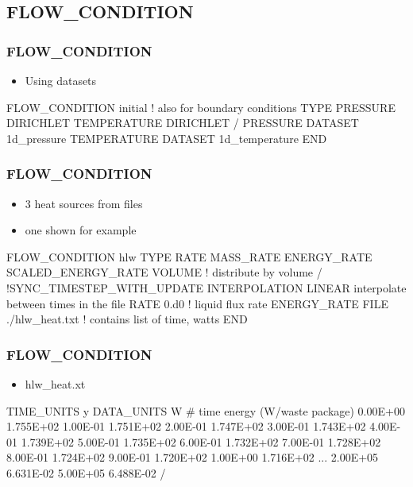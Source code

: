 \documentclass{beamer}
\newcommand\bluecomment[1]{{{\color{blue} #1}}}
\begin{document}
\subsection{FLOW\_CONDITION}

\begin{frame}[fragile]\frametitle{FLOW\_CONDITION}
\begin{itemize}
  \item{Using datasets}
\end{itemize}

\begin{semiverbatim}
FLOW_CONDITION initial \bluecomment{! also for boundary conditions}
  TYPE
    PRESSURE DIRICHLET
    TEMPERATURE DIRICHLET
  /
  PRESSURE DATASET 1d_pressure
  TEMPERATURE DATASET 1d_temperature
END

\end{semiverbatim}
\end{frame}

\begin{frame}[fragile]\frametitle{FLOW\_CONDITION}
\begin{itemize}
  \item{3 heat sources from files}
  \item{one shown for example}
\end{itemize}

\begin{semiverbatim}
FLOW_CONDITION hlw
  TYPE
    RATE MASS_RATE
    ENERGY_RATE SCALED_ENERGY_RATE VOLUME \bluecomment{! distribute by volume}
  /
  \bluecomment{!SYNC_TIMESTEP_WITH_UPDATE}
  INTERPOLATION LINEAR \bluecomment{interpolate between times in the file}
  RATE 0.d0 \bluecomment{! liquid flux rate}
  ENERGY_RATE FILE ./hlw_heat.txt \bluecomment{! contains list of time, watts}
END

\end{semiverbatim}
\end{frame}

\begin{frame}[fragile]\frametitle{FLOW\_CONDITION}
\begin{itemize}
  \item{hlw\_heat.xt}
\end{itemize}

\begin{semiverbatim}\small
TIME_UNITS y
DATA_UNITS W
# time energy (W/waste package)
0.00E+00        1.755E+02
1.00E-01        1.751E+02
2.00E-01        1.747E+02
3.00E-01        1.743E+02
4.00E-01        1.739E+02
5.00E-01        1.735E+02
6.00E-01        1.732E+02
7.00E-01        1.728E+02
8.00E-01        1.724E+02
9.00E-01        1.720E+02
1.00E+00        1.716E+02
\bluecomment{...}
2.00E+05        6.631E-02
5.00E+05        6.488E-02
/
\end{semiverbatim}
\end{frame}
\end{document}
